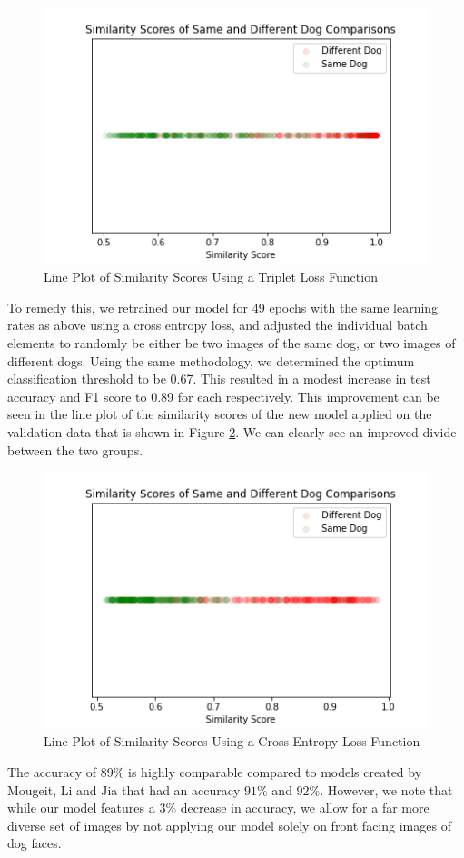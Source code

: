 \documentclass{article}
\begin{document}
\begin{figure}[h]
\centering
	\includegraphics[scale=0.7]{final-report-images/triplet_lineplot.png}
\caption{Line Plot of Similarity Scores Using a Triplet Loss Function}
\label{fig:x triplet lineplot}
\end{figure}
To remedy this, we retrained our model for 49 epochs with the same learning rates as above using a cross entropy loss, and adjusted the individual batch elements to randomly be either be two images of the same dog, or two images of different dogs.  Using the same methodology, we determined the optimum classification threshold to be 0.67.  This resulted in a modest increase in test accuracy and F1 score to 0.89 for each respectively.  This improvement can be seen in the line plot of the similarity scores of the new model applied on the validation data that is shown in Figure \ref{fig:x triplet lineplot}.  We can clearly see an improved divide between the two groups.

\begin{figure}[h]
\centering
	\includegraphics[scale=0.7]{final-report-images/crossentropy_lineplot.png}
\caption{Line Plot of Similarity Scores Using a Cross Entropy Loss Function}
\label{fig:x triplet lineplot}
\end{figure}
The accuracy of $89\%$ is highly comparable compared to models created by Mougeit, Li and Jia that had an accuracy $91\%$ and $92\%$.  However, we note that while our model features a $3\%$ decrease in accuracy, we allow for a far more diverse set of images by not applying our model solely on front facing images of dog faces.
\end{document}

